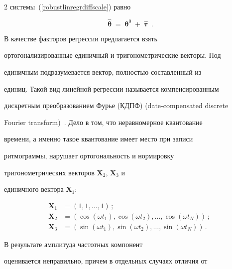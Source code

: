 \begin{multicols}{2}
сис\-те\-мы~(\ref{robustlinregrdiffscale}) равно


\begin{equation}\label{robustthetasol}


\hat{\bm{\uptheta}} =


\bm{\uptheta}^0 + \hat{\bm{\uptau}}\,.


\end{equation}





В качестве факторов регрессии предлагается взять


ортогонализированные единичный и тригонометрические векторы. Под


единичным подразумевается вектор, полностью составленный из


единиц. Такой вид линейной регрессии называется компенсированным


дискретным преобразованием Фурье (КДПФ) (date-compensated discrete


Fourier transform)~\cite{7ma}. Дело в том, что неравномерное квантование


времени, а именно такое квантование имеет место при записи


ритмограммы, нарушает ортогональность и нормировку


тригонометрических векторов $\mathbf{X}_2$, $\mathbf{X}_3$ и


единичного вектора $\mathbf{X}_1$:





\noindent


\begin{align}


\mathbf{X}_1&=(1,1,\ldots,1)\,;\label{trialones}\\


\mathbf{X}_2&=(\cos(\omega t_1),\cos(\omega t_2),\ldots,\cos(\omega


t_N))\,; \label{trialcos}\\


\mathbf{X}_3&=(\sin(\omega t_1),\sin(\omega t_2),\ldots,\sin(\omega


t_N))\,.


\label{trialsin}


\end{align}


В результате амплитуда частотных компонент


оценивается неправильно, причем в отдельных случаях отличия от



\end{multicols}

